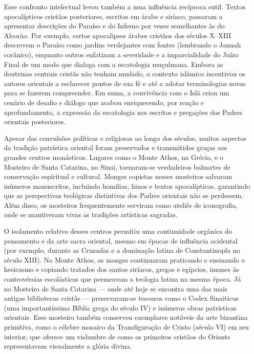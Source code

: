 Esse confronto intelectual levou também a uma influência recíproca sutil. Textos apocalípticos cristãos posteriores, escritos em árabe e siríaco, passaram a apresentar descrições do Paraíso e do Inferno por vezes semelhantes às do Alcorão. Por exemplo, certos apocalipses árabes cristãos dos séculos X--XIII descrevem o Paraíso como jardins verdejantes com fontes (lembrando o Jannah corânico), enquanto outros enfatizam a severidade e a imparcialidade do Juízo Final de um modo que dialoga com a escatologia muçulmana. Embora as doutrinas centrais cristãs não tenham mudado, o contexto islâmico incentivou os autores orientais a esclarecer pontos de sua fé e até a adotar terminologias novas para se fazerem compreender. Em suma, a convivência com o Islã criou um cenário de desafio e diálogo que acabou enriquecendo, por reação e aprofundamento, a expressão da escatologia nos escritos e pregações dos Padres orientais posteriores.

Apesar das convulsões políticas e religiosas ao longo dos séculos, muitos aspectos da tradição patrística oriental foram preservados e transmitidos graças aos grandes centros monásticos. Lugares como o Monte Athos, na Grécia, e o Mosteiro de Santa Catarina, no Sinai, tornaram-se verdadeiros baluartes de conservação espiritual e cultural. Monges copistas nesses mosteiros salvaram inúmeros manuscritos, incluindo homilias, hinos e textos apocalípticos, garantindo que as perspectivas teológicas distintivas dos Padres orientais não se perdessem. Além disso, os mosteiros frequentemente serviram como ateliês de iconografia, onde se mantiveram vivas as tradições artísticas sagradas.

O isolamento relativo desses centros permitiu uma continuidade orgânica do pensamento e da arte sacra oriental, mesmo em épocas de influência ocidental (por exemplo, durante as Cruzadas e a dominação latina de Constantinopla no século XIII). No Monte Athos, os monges continuaram praticando e ensinando o hesicasmo e copiando tratados dos santos siríacos, gregos e egípcios, imunes às controvérsias escolásticas que permeavam a teologia latina na mesma época. Já no Mosteiro de Santa Catarina --- onde até hoje se encontra uma das mais antigas bibliotecas cristãs --- preservaram-se tesouros como o Codex Sinaiticus (uma importantíssima Bíblia grega do século IV) e inúmeras obras patrísticas orientais. Esse mosteiro também conservou exemplares notáveis da arte bizantina primitiva, como o célebre mosaico da Transfiguração de Cristo (século VI) em seu interior, que oferece um vislumbre de como os primeiros cristãos do Oriente representavam visualmente a glória divina.

